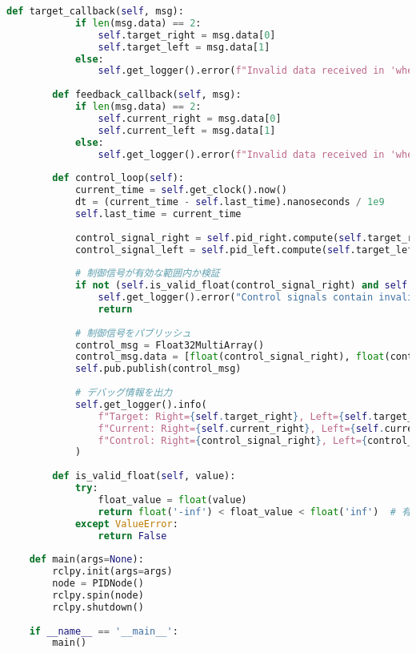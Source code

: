 \begin{lstlisting}[language=Python, caption=PID\_node.py]
        def target_callback(self, msg):
            if len(msg.data) == 2:
                self.target_right = msg.data[0]
                self.target_left = msg.data[1]
            else:
                self.get_logger().error(f"Invalid data received in 'wheel_targets'. Expected 2 floats, got {len(msg.data)}")
    
        def feedback_callback(self, msg):
            if len(msg.data) == 2:
                self.current_right = msg.data[0]
                self.current_left = msg.data[1]
            else:
                self.get_logger().error(f"Invalid data received in 'wheel_feedback'. Expected 2 floats, got {len(msg.data)}")
    
        def control_loop(self):
            current_time = self.get_clock().now()
            dt = (current_time - self.last_time).nanoseconds / 1e9
            self.last_time = current_time
    
            control_signal_right = self.pid_right.compute(self.target_right, self.current_right, dt)
            control_signal_left = self.pid_left.compute(self.target_left, self.current_left, dt)
    
            # 制御信号が有効な範囲内か検証
            if not (self.is_valid_float(control_signal_right) and self.is_valid_float(control_signal_left)):
                self.get_logger().error("Control signals contain invalid values. Skipping this loop.")
                return
    
            # 制御信号をパブリッシュ
            control_msg = Float32MultiArray()
            control_msg.data = [float(control_signal_right), float(control_signal_left)]
            self.pub.publish(control_msg)
    
            # デバッグ情報を出力
            self.get_logger().info(
                f"Target: Right={self.target_right}, Left={self.target_left} | "
                f"Current: Right={self.current_right}, Left={self.current_left} | "
                f"Control: Right={control_signal_right}, Left={control_signal_left}"
            )
    
        def is_valid_float(self, value):
            try:
                float_value = float(value)
                return float('-inf') < float_value < float('inf')  # 有限数の検証
            except ValueError:
                return False
    
    def main(args=None):
        rclpy.init(args=args)
        node = PIDNode()
        rclpy.spin(node)
        rclpy.shutdown()
    
    if __name__ == '__main__':
        main()
\end{lstlisting}

